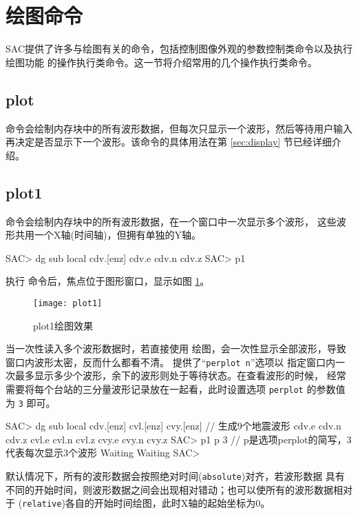 \section{绘图命令}
SAC提供了许多与绘图有关的命令，包括控制图像外观的参数控制类命令以及执行绘图功能
的操作执行类命令。这一节将介绍常用的几个操作执行类命令。

\subsection{plot}
 命令会绘制内存块中的所有波形数据，但每次只显示一个波形，然后等待用户输入
再决定是否显示下一个波形。该命令的具体用法在第 \ref{sec:display} 节已经详细介绍。

\subsection{plot1}
 命令会绘制内存块中的所有波形数据，在一个窗口中一次显示多个波形，
这些波形共用一个X轴(时间轴)，但拥有单独的Y轴。

\begin{SACCode}
SAC> dg sub local cdv.[enz]
cdv.e cdv.n cdv.z
SAC> p1
\end{SACCode}

执行  命令后，焦点位于图形窗口，显示如图 \ref{fig:plot1}。
\begin{figure}[H]
\centering
\texttt{[image: plot1]}
\caption{plot1绘图效果}
\label{fig:plot1}
\end{figure}

当一次性读入多个波形数据时，若直接使用  绘图，会一次性显示全部波形，导致
窗口内波形太密，反而什么都看不清。 提供了``\texttt{perplot n}''选项以
指定窗口内一次最多显示多少个波形，余下的波形则处于等待状态。在查看波形的时候，
经常需要将每个台站的三分量波形记录放在一起看，此时设置选项 \texttt{perplot} 的参数值为 \texttt{3} 即可。
\begin{SACCode}
SAC> dg sub local cdv.[enz] cvl.[enz] cvy.[enz]  // 生成9个地震波形
cdv.e cdv.n cdv.z cvl.e cvl.n cvl.z cvy.e cvy.n cvy.z
SAC> p1 p 3         // p是选项perplot的简写，3代表每次显示3个波形
Waiting
Waiting
SAC>
\end{SACCode}

默认情况下，所有的波形数据会按照绝对时间(\texttt{absolute})对齐，若波形数据
具有不同的开始时间，则波形数据之间会出现相对错动；也可以使所有的波形数据相对于
(\texttt{relative})各自的开始时间绘图，此时X轴的起始坐标为0。

